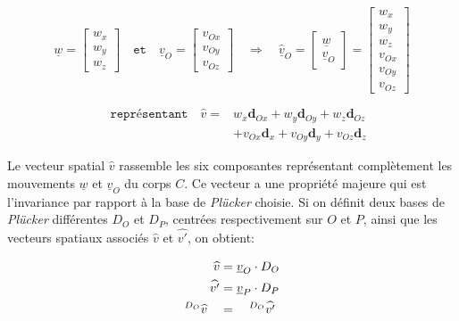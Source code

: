 \documentclass{report}
\begin{document}
\begin{minipage}[c]{.55\textwidth}
$$
\underline{w}=
\begin{bmatrix}
w_{x} \\
w_{y} \\
w_{z}
\end{bmatrix}
\quad \texttt{et} \quad
\underline{v}_{O}=
\begin{bmatrix}
v_{Ox} \\
v_{Oy} \\
v_{Oz}
\end{bmatrix}
\quad \Rightarrow \quad
\underline{\widehat{v}}_{O}=
\begin{bmatrix}
\underline{w} \\
\underline{v}_{O}
\end{bmatrix}
=
\begin{bmatrix}
w_{x} \\
w_{y} \\
w_{z} \\
v_{Ox} \\
v_{Oy} \\
v_{Oz}
\end{bmatrix}
$$
\end{minipage}
\begin{minipage}[c]{.45\textwidth}
\begin{align*}
\quad \texttt{représentant} \quad
\widehat{v} = 
  &w_{x}\textbf{d}_{Ox} + w_{y}\textbf{d}_{Oy} + w_{z}\textbf{d}_{Oz} \\
  &+ v_{Ox}\textbf{d}_{x} + v_{Oy}\textbf{d}_{y} + v_{Oz}\textbf{d}_{z}
\end{align*}
\end{minipage}

\vspace{0.3cm} %

Le vecteur spatial $\widehat{v}$ rassemble les six composantes représentant complètement les mouvements $\underline{w}$ et $\underline{v}_{O}$ du corps $C$. Ce vecteur a une propriété majeure qui est l'invariance par rapport à la base de \emph{Plücker} choisie. Si on définit deux bases de \emph{Plücker} différentes $D_{O}$ et $D_{P}$, centrées respectivement sur $O$ et $P$, ainsi que les vecteurs spatiaux associés $\widehat{v}$ et $\widehat{v'}$, on obtient:

\begin{align}
\widehat{v}  &= \underline{v}_{O} \cdot D_{O} \notag \\
\widehat{v'} &= \underline{v}_{P} \cdot D_{P} \notag \\
^{D_{O}}\widehat{v} \quad &= \quad ^{D_{O}}\widehat{v'}
\label{equ_invariant}
\end{align}
\end{document}
